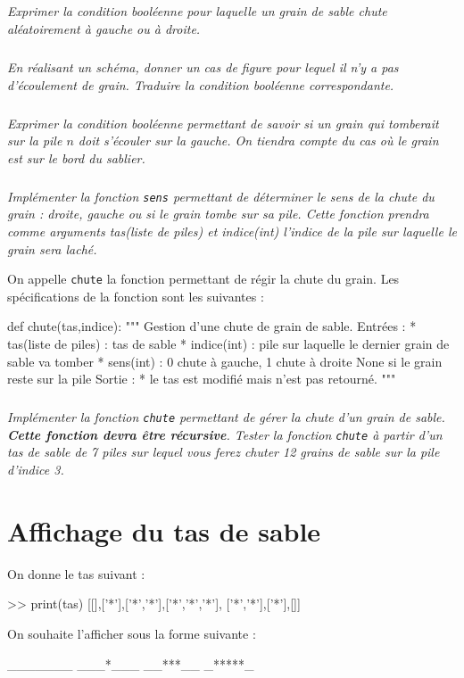 \documentclass[10pt,fleqn]{article} %
\begin{document}
\begin{multicols}{2}
\subparagraph{}
\textit{Exprimer la condition booléenne pour laquelle un grain de sable chute aléatoirement à gauche ou à droite.}

\subparagraph{}
\textit{En réalisant un schéma, donner un cas de figure pour lequel il n'y a pas d'écoulement de grain. Traduire la condition booléenne correspondante.}

\subparagraph{}
\textit{Exprimer la condition booléenne permettant de savoir si un grain qui tomberait sur la pile $n$ doit s'écouler sur la gauche. On tiendra compte du cas où le grain est sur le bord du sablier. }

\subparagraph{}
\textit{Implémenter la fonction \texttt{sens} permettant de déterminer le sens de la chute du grain : droite, gauche ou si le grain tombe sur sa pile. Cette fonction prendra comme arguments tas(liste de piles) et indice(int) l'indice de la pile sur laquelle le grain sera laché.}

\vspace{.25cm}

On appelle \texttt{chute} la fonction permettant de régir la chute du grain. Les spécifications de la fonction sont les suivantes : 
\begin{py}
\begin{python}
def chute(tas,indice):
    """
    Gestion d'une chute de grain de sable.
    Entrées : 
     * tas(liste de piles) : tas de sable
     * indice(int) : pile sur laquelle le dernier 
		grain de sable va tomber
     * sens(int) : 0 chute à gauche, 1 chute à droite
		None si le grain reste sur la pile
    Sortie : 
     * le tas est modifié mais n'est pas retourné.
    """
\end{python}
\end{py}

\subparagraph{}
\textit{Implémenter la fonction \texttt{chute} permettant de gérer la chute d'un grain de sable. \textbf{Cette fonction devra être récursive}. Tester la fonction \texttt{chute} à partir d'un tas de sable de 7 piles sur lequel vous ferez chuter 12 grains de sable sur la pile d'indice 3.}

\section*{Affichage du tas de sable}
On donne le tas suivant : 
\begin{py}
\begin{python}
>> print(tas)
    [[],['*'],['*','*'],['*','*','*'], 
		['*','*'],['*'],[]]
\end{python}
\end{py}
On souhaite l'afficher sous la forme suivante : 
\begin{py}
\begin{python}
_______
___*___
__***__
_*****_
\end{python}
\end{py}


\end{multicols}
\end{document}
